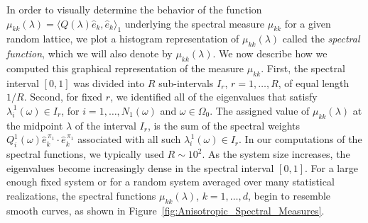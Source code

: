 \documentclass{cmslatex}
\begin{document}
In order to visually determine the behavior of the function
$\mu_{kk}(\lambda)=\langle Q(\lambda)\hat{e}_k,\hat{e}_k\rangle_1$ underlying the spectral
measure $\mu_{kk}$ for a given random lattice, we plot a histogram
representation of $\mu_{kk}(\lambda)$ called the \emph{spectral function},
which we will also denote by $\mu_{kk}(\lambda)$. We now describe how 
we computed this graphical representation of the measure
$\mu_{kk}$. First, the spectral interval $[0,1]$ was divided into $R$
sub-intervals $I_r$, $r=1,\ldots,R$, of equal length $1/R$. Second, for
fixed $r$, we identified all of the eigenvalues that satisfy
$\lambda^{\,1}_i(\omega)\in I_r$, for $i=1,\ldots,N_1(\omega)$ and $\omega\in\Omega_0$. The assigned
value of $\mu_{kk}(\lambda)$ at the midpoint $\lambda$ of the interval $I_r$, is the
sum of the spectral weights
$Q^1_i(\omega)\hat{e}_k^{\,\pi_1}\cdot\hat{e}_k^{\,\pi_1}$ associated with all such
$\lambda^{\,1}_i(\omega)\in I_r$. In our computations of the spectral functions, we 
typically used $R\sim10^2$. As the system size increases, the eigenvalues
become increasingly dense in the spectral interval $[0,1]$. For a
large enough fixed system or for a random system averaged over many
statistical realizations, the spectral functions $\mu_{kk}(\lambda)$,
$k=1,\ldots,d$, begin to resemble smooth curves, as shown in
Figure~\ref{fig:Anisotropic_Spectral_Measures}.      
\end{document}
